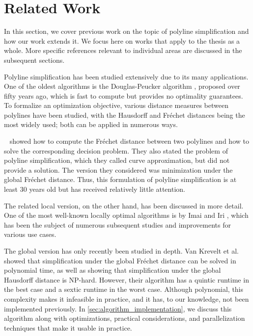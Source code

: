 \section{Related Work}
\label{sec:related_work}

In this section, we cover previous work on the topic of polyline simplification and how our work extends it. We focus here on works that apply to the thesis as a whole. More specific references relevant to individual areas are discussed in the subsequent sections.

Polyline simplification has been studied extensively due to its many applications. One of the oldest algorithms is the Douglas-Peucker algorithm \cite{algorithms_reduction_number_points_caricature}, proposed over fifty years ago, which is fast to compute but provides no optimality guarantees. To formalize an optimization objective, various distance measures between polylines have been studied, with the Hausdorff and Fréchet distances being the most widely used; both can be applied in numerous ways.

\citeauthor{computing_the_frechet_distance_between_two_polygonal_curves}~\cite{computing_the_frechet_distance_between_two_polygonal_curves} showed how to compute the Fréchet distance between two polylines and how to solve the corresponding decision problem. They also stated the problem of polyline simplification, which they called curve approximation, but did not provide a solution. The version they considered was minimization under the global Fréchet distance. Thus, this formulation of polyline simplification is at least 30 years old but has received relatively little attention.

The related local version, on the other hand, has been discussed in more detail. One of the most well-known locally optimal algorithms is by Imai and Iri \cite{computational_geometric_methods_for_polygonal_approximations_of_a_curve}, which has been the subject of numerous subsequent studies and improvements for various use cases.

The global version has only recently been studied in depth. Van Krevelt et al.~\cite{on_optimal_polyline_simplification_using_the_hausdorff_and_frechet_distance} showed that simplification under the global Fréchet distance can be solved in polynomial time, as well as showing that simplification under the global Hausdorff distance is NP-hard. However, their algorithm has a quintic runtime in the best case and a sextic runtime in the worst case. Although polynomial, this complexity makes it infeasible in practice, and it has, to our knowledge, not been implemented previously. In \cref{sec:algorithm_implementation}, we discuss this algorithm along with optimizations, practical considerations, and parallelization techniques that make it usable in practice.

